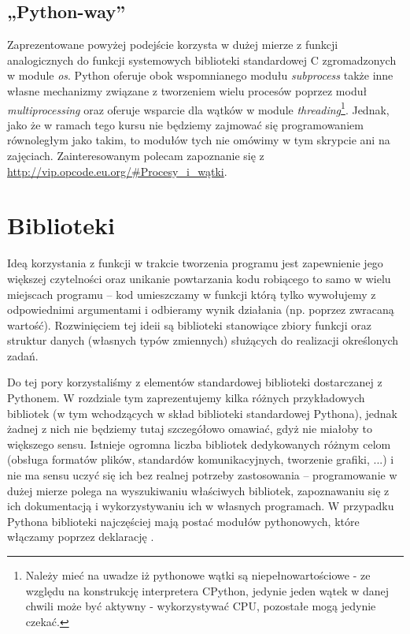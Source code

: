 \documentclass{pdfBooklets}
\begin{document}
\subsection{„Python-way”}

Zaprezentowane powyżej podejście korzysta w dużej mierze z funkcji analogicznych do funkcji systemowych biblioteki standardowej C zgromadzonych w module \textit{os}.
Python oferuje obok wspomnianego modułu \textit{subprocess} także inne własne mechanizmy związane z tworzeniem wielu procesów poprzez moduł \textit{multiprocessing}
	oraz oferuje wsparcie dla wątków w module \textit{threading}\footnote{
		Należy mieć na uwadze iż pythonowe wątki są niepełnowartościowe - ze względu na konstrukcję interpretera CPython,
		jedynie jeden wątek w danej chwili może być aktywny - wykorzystywać CPU, pozostałe mogą jedynie czekać.
	}.
Jednak, jako że w ramach tego kursu nie będziemy zajmować się programowaniem równoległym jako takim, to modułów tych nie omówimy w tym skrypcie ani na zajęciach.
Zainteresowanym polecam zapoznanie się z \url{http://vip.opcode.eu.org/#Procesy_i_wątki}.

\section{Biblioteki}

Ideą korzystania z funkcji w trakcie tworzenia programu jest zapewnienie jego większej czytelności oraz unikanie powtarzania kodu robiącego to samo w wielu miejscach programu – kod umieszczamy w funkcji którą tylko wywołujemy z odpowiednimi argumentami i odbieramy wynik działania (np. poprzez zwracaną wartość). Rozwinięciem tej ideii są biblioteki stanowiące zbiory funkcji oraz struktur danych (własnych typów zmiennych) służących do realizacji określonych zadań.

Do tej pory korzystaliśmy z elementów standardowej biblioteki dostarczanej z Pythonem. W rozdziale tym zaprezentujemy kilka różnych przykładowych bibliotek (w tym wchodzących w skład biblioteki standardowej Pythona), jednak żadnej z nich nie będziemy tutaj szczegółowo omawiać, gdyż nie miałoby to większego sensu. Istnieje ogromna liczba bibliotek dedykowanych różnym celom (obsługa formatów plików, standardów komunikacyjnych, tworzenie grafiki, ...) i nie ma sensu uczyć się ich bez realnej potrzeby zastosowania – programowanie w dużej mierze polega na wyszukiwaniu właściwych bibliotek, zapoznawaniu się z ich dokumentacją i wykorzystywaniu ich w własnych programach. W przypadku Pythona biblioteki najczęściej mają postać modułów pythonowych, które włączamy poprzez deklarację .
\end{document}
